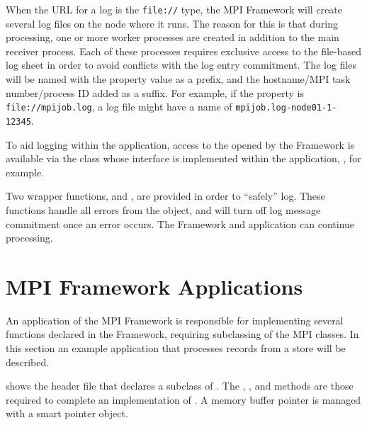 When the URL for a log is the {\tt file://} type, the MPI Framework will create
several log files on the node where it runs. The reason for this is that during
 processing, one or more worker processes are created in
addition to the main receiver process. Each of these processes requires
exclusive access to the file-based log sheet in order to avoid conflicts with
the log entry commitment.
The log files will be named with the property value
as a prefix, and the hostname/MPI task number/process ID added as a suffix.
For example, if the property is \verb=file://mpijob.log=, a log file might
have a name of \verb=mpijob.log-node01-1-12345=.

To aid logging within the application, access to the  opened
by the Framework is available via the class whose interface is implemented
within the application, , for example.

Two wrapper functions,  and ,
are provided in order to ``safely'' log. These functions handle all errors
from the  object, and will turn off log message commitment
once an error occurs. The Framework and application can continue processing.

\section{MPI Framework Applications}
\label{sec-mpiapp}

An application of the MPI Framework is responsible for implementing several
functions declared in the Framework, requiring subclassing of the MPI classes.
In this section an example application that processes records from a store will
be described. 

 shows the header file that declares a subclass of
. The ,
, and  methods are those
required to complete an implementation of .
A memory buffer pointer is managed with a smart pointer object.

